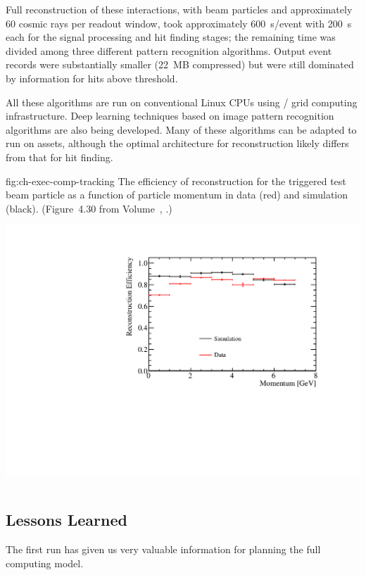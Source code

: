 Full reconstruction of these  interactions, with beam particles and approximately 60 cosmic rays per readout window, took  approximately \SI{600}{s/event} with \SI{200}{s} each for the signal processing and hit finding stages; the remaining time was divided among three different pattern recognition algorithms. Output event records were substantially smaller (\SI{22}{MB} compressed) but were still dominated by information for  hits above threshold. 

All these algorithms are run on conventional %
Linux CPUs using / grid computing  infrastructure. Deep learning techniques based on image pattern recognition algorithms are also being developed. Many of these algorithms can be adapted to run on  assets, although the optimal architecture for \threed reconstruction likely differs from that for hit finding.

\begin{dunefigure}
{fig:ch-exec-comp-tracking}
{The efficiency of reconstruction for the triggered test beam particle as a function of particle
momentum in data (red) and simulation (black). (Figure~4.30 from Volume~\volnumberphysics{}, \voltitlephysics{}.)}
\includegraphics[height=4in]{graphics/BeamParticleEfficiencyVsMomentum.pdf}
\end{dunefigure}

\subsection{Lessons Learned}
The first  run has given us very valuable information for planning the full  computing model. 


